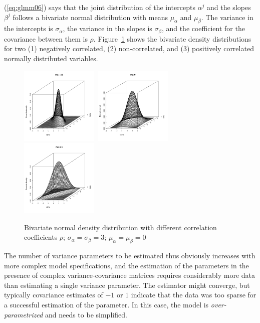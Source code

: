 \documentclass[a4paper,12pt]{article}
\begin{document}
(\ref{eq:glmm06}) says that the joint distribution of the intercepts $\alpha^j$ and the slopes $\beta^j$ follows a bivariate normal distribution with means $\mu_{\alpha}$ and $\mu_{\beta}$.
The variance in the intercepts is $\sigma_{\alpha}$, the variance in the slopes is $\sigma_{\beta}$, and the coefficient for the covariance between them is $\rho$.
Figure~\ref{fig:multnorm} shows the bivariate density distributions for two (1) negatively correlated, (2) non-correlated, and (3) positively correlated normally distributed variables.

\begin{figure}[!htpb]
  \centering
  \includegraphics[width=0.33\textwidth]{graphics/multnorm1}~\includegraphics[width=0.33\textwidth]{graphics/multnorm2}~\includegraphics[width=0.33\textwidth]{graphics/multnorm3}
  \caption{Bivariate normal density distribution with different correlation coefficients $\rho$; $\sigma_{\alpha}=\sigma_{\beta}=3$; $\mu_{\alpha}=\mu_{\beta}=0$}
  \label{fig:multnorm}
\end{figure}

The number of variance parameters to be estimated thus obviously increases with more complex model specifications, and the estimation of the parameters in the presence of complex variance-covariance matrices requires considerably more data than estimating a single variance parameter.
The estimator might converge, but typically covariance estimates of $-1$ or $1$ indicate that the data was too sparse for a successful estimation of the parameter.
In this case, the model is \textit{over-parametrized} and needs to be simplified.
\end{document}
